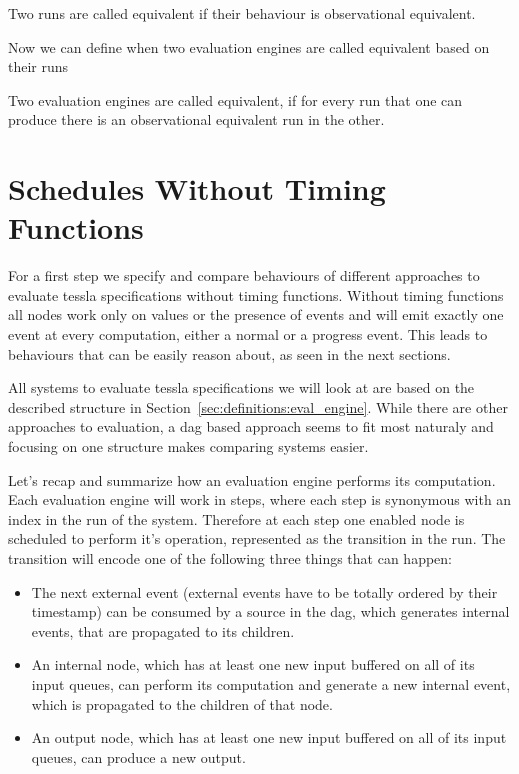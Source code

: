 \begin{definition}[name=Equivalence of Runs]\label{def:equivalence_runs}
  Two runs are called equivalent if their behaviour is observational equivalent.
\end{definition}

Now we can define when two evaluation engines are called equivalent based on their runs

\begin{definition}[name=Equivalence of Evaluation Engines]\label{def:equivalence_eval_engine}
  Two evaluation engines are called equivalent, if for every run that one can produce there is an observational equivalent run in the other.
\end{definition}

\section{Schedules Without Timing Functions}
\label{sec:behaviours:without_timing}

For a first step we specify and compare behaviours of different approaches to evaluate \gls{tessla} specifications without timing functions.
Without timing functions all nodes work only on values or the presence of events and will emit exactly one event at every computation, either a normal or a progress event.
This leads to behaviours that can be easily reason about, as seen in the next sections.

All systems to evaluate \gls{tessla} specifications we will look at are based on the described structure in Section~\ref{sec:definitions:eval_engine}.
While there are other approaches to evaluation, a \gls{dag} based approach seems to fit most naturaly and focusing on one structure makes comparing systems easier.

Let's recap and summarize how an evaluation engine performs its computation.
Each evaluation engine will work in steps, where each step is synonymous with an index in the run of the system.
Therefore at each step one enabled node is scheduled to perform it's operation, represented as the transition in the run.
The transition will encode one of the following three things that can happen:

\begin{itemize}
  \item The next external event (external events have to be totally ordered by their timestamp) can be consumed by a source in the \gls{dag}, which generates internal events, that are propagated to its children.
  \item An internal node, which has at least one new input buffered on all of its input queues, can perform its computation and generate a new internal event, which is propagated to the children of that node.
  \item An output node, which has at least one new input buffered on all of its input queues, can produce a new output.
\end{itemize}

